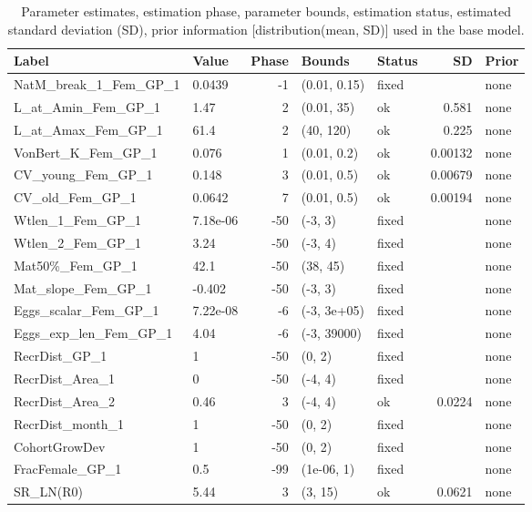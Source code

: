 \documentclass[
]{scrartcl}
\begin{document}
\begingroup
\fontsize{9.0pt}{10.8pt}\selectfont

\begin{longtable}{llrllrl}

\caption{\label{tbl-pars}Parameter estimates, estimation phase,
parameter bounds, estimation status, estimated standard deviation (SD),
prior information {[}distribution(mean, SD){]} used in the base model.}

\tabularnewline

\toprule
Label & Value & Phase & Bounds & Status & SD & Prior \\ 
\midrule\addlinespace[2.5pt]
NatM\_break\_1\_Fem\_GP\_1 & 0.0439 & -1 & (0.01, 0.15) & fixed &  & none \\ 
L\_at\_Amin\_Fem\_GP\_1 & 1.47 & 2 & (0.01, 35) & ok & 0.581 & none \\ 
L\_at\_Amax\_Fem\_GP\_1 & 61.4 & 2 & (40, 120) & ok & 0.225 & none \\ 
VonBert\_K\_Fem\_GP\_1 & 0.076 & 1 & (0.01, 0.2) & ok & 0.00132 & none \\ 
CV\_young\_Fem\_GP\_1 & 0.148 & 3 & (0.01, 0.5) & ok & 0.00679 & none \\ 
CV\_old\_Fem\_GP\_1 & 0.0642 & 7 & (0.01, 0.5) & ok & 0.00194 & none \\ 
Wtlen\_1\_Fem\_GP\_1 & 7.18e-06 & -50 & (-3, 3) & fixed &  & none \\ 
Wtlen\_2\_Fem\_GP\_1 & 3.24 & -50 & (-3, 4) & fixed &  & none \\ 
Mat50\%\_Fem\_GP\_1 & 42.1 & -50 & (38, 45) & fixed &  & none \\ 
Mat\_slope\_Fem\_GP\_1 & -0.402 & -50 & (-3, 3) & fixed &  & none \\ 
Eggs\_scalar\_Fem\_GP\_1 & 7.22e-08 & -6 & (-3, 3e+05) & fixed &  & none \\ 
Eggs\_exp\_len\_Fem\_GP\_1 & 4.04 & -6 & (-3, 39000) & fixed &  & none \\ 
RecrDist\_GP\_1 & 1 & -50 & (0, 2) & fixed &  & none \\ 
RecrDist\_Area\_1 & 0 & -50 & (-4, 4) & fixed &  & none \\ 
RecrDist\_Area\_2 & 0.46 & 3 & (-4, 4) & ok & 0.0224 & none \\ 
RecrDist\_month\_1 & 1 & -50 & (0, 2) & fixed &  & none \\ 
CohortGrowDev & 1 & -50 & (0, 2) & fixed &  & none \\ 
FracFemale\_GP\_1 & 0.5 & -99 & (1e-06, 1) & fixed &  & none \\ 
SR\_LN(R0) & 5.44 & 3 & (3, 15) & ok & 0.0621 & none \\ 

\end{longtable}
\end{document}
